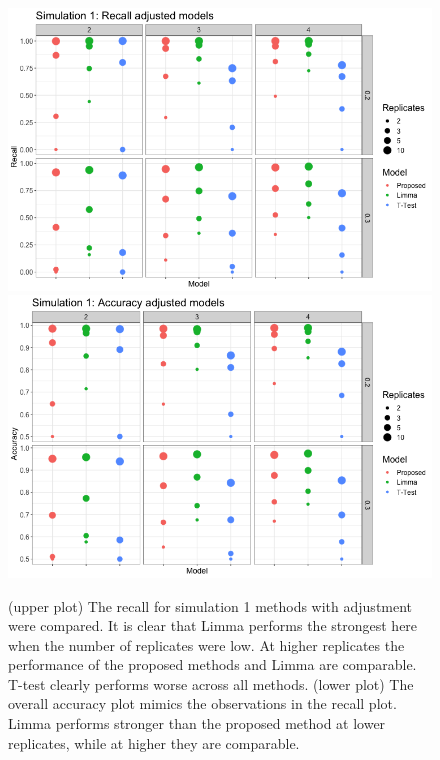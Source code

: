 \documentclass{mcp}
\begin{document}
\begin{figure}[h!]
\centering
\includegraphics[width=.85\textwidth]{sim_new/sim1_Recall}\\
\includegraphics[width=.85\textwidth]{sim_new/sim1_accuracy}
\caption{(upper plot) The recall for simulation 1 methods with adjustment were compared. It is clear that Limma performs the strongest here when the number of replicates were low.  At higher replicates the performance of the proposed methods and Limma are comparable. T-test clearly performs worse across all methods. (lower plot) The overall accuracy plot mimics the observations in the recall plot. Limma performs stronger than the proposed method at lower replicates, while at higher they are comparable. \label{fig:sim1_recall}}
\end{figure}
\end{document}
